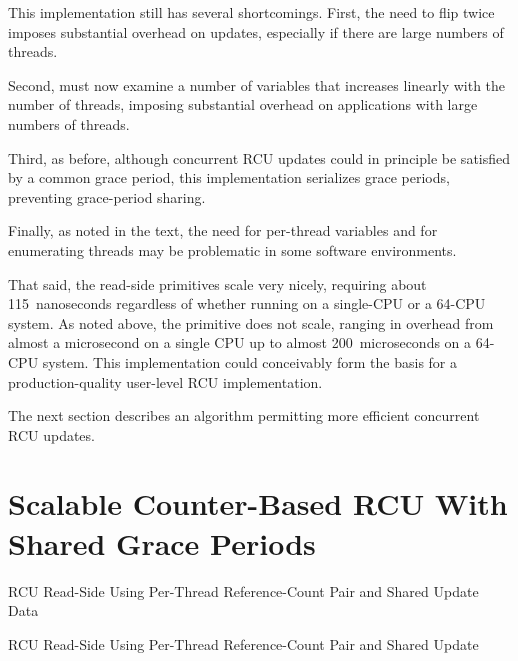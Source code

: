 This implementation still has several shortcomings.
First, the need to flip  twice imposes substantial overhead
on updates, especially if there are large numbers of threads.

Second,  must now examine a number of variables
that increases linearly with the number of threads, imposing substantial
overhead on applications with large numbers of threads.

Third, as before, although concurrent RCU updates could in principle
be satisfied by a common grace period, this implementation serializes
grace periods, preventing grace-period sharing.

Finally, as noted in the text, the need for per-thread variables
and for enumerating threads may be problematic in some software
environments.

That said, the read-side primitives scale very nicely, requiring about
115~nanoseconds regardless of whether running on a single-CPU or a 64-CPU
 system.
As noted above, the  primitive does not scale,
ranging in overhead from almost a microsecond on a single  CPU
up to almost 200~microseconds on a 64-CPU system.
This implementation could conceivably form the basis for a
production-quality user-level RCU implementation.

The next section describes an algorithm permitting more efficient
concurrent RCU updates.

\section{Scalable Counter-Based RCU With Shared Grace Periods}
\label{sec:app:toyrcu:Scalable Counter-Based RCU With Shared Grace Periods}

\begin{listing}[tbp]

\caption{RCU Read-Side Using Per-Thread Reference-Count Pair and Shared Update Data}
\label{lst:app:toyrcu:RCU Read-Side Using Per-Thread Reference-Count Pair and Shared Update Data}
\end{listing}

\begin{listing}[tbp]

\caption{RCU Read-Side Using Per-Thread Reference-Count Pair and Shared Update}
\label{lst:app:toyrcu:RCU Read-Side Using Per-Thread Reference-Count Pair and Shared Update}
\end{listing}

